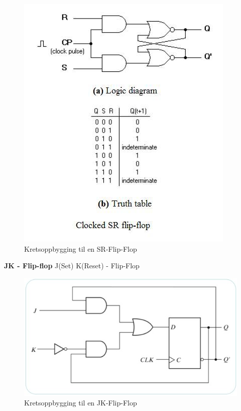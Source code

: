 \documentclass{article}
\begin{document}
	\begin{figure}[H]
		\includegraphics[scale = 0.6]{srFlip.jpg}
		\caption{Kretsoppbygging til en SR-Flip-Flop}
	\end{figure}
	
	\textbf{JK - Flip-flop}
	J(Set) K(Reset) - Flip-Flop
	
	\begin{figure}[H]
		\includegraphics[scale = 0.6]{jkFlip.jpg}
		\caption{Kretsoppbygging til en JK-Flip-Flop}
	\end{figure}
	
\end{document}
